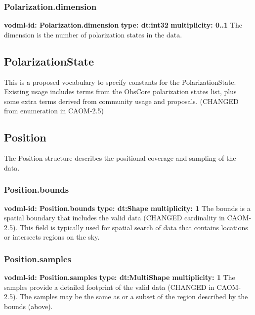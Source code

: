     \subsubsection{Polarization.dimension}
      \textbf{vodml-id: Polarization.dimension} \newline
      \textbf{type: dt:int32} \newline
      \textbf{multiplicity: 0..1} \newline
      The dimension is the number of polarization states in the data.

  \subsection{PolarizationState}
  \label{sect:PolarizationState}
    This is a proposed vocabulary to specify constants for the PolarizationState. Existing usage includes terms from the ObsCore polarization states list, plus some extra terms derived from community usage and proposals. (CHANGED from enumeration in CAOM-2.5)

  \subsection{Position}
  \label{sect:Position}
    The Position structure describes the positional coverage and sampling of the data.

    \subsubsection{Position.bounds}
      \textbf{vodml-id: Position.bounds} \newline
      \textbf{type: dt:Shape} \newline
      \textbf{multiplicity: 1} \newline
      The bounds is a spatial boundary that includes the valid data (CHANGED cardinality in CAOM-2.5). This field is typically used for spatial search of data that contains locations or intersects regions on the sky.

    \subsubsection{Position.samples}
      \textbf{vodml-id: Position.samples} \newline
      \textbf{type: dt:MultiShape} \newline
      \textbf{multiplicity: 1} \newline
      The samples provide a detailed footprint of the valid data (CHANGED in CAOM-2.5). The samples may be the same as or a subset of the region described by the bounds (above).

